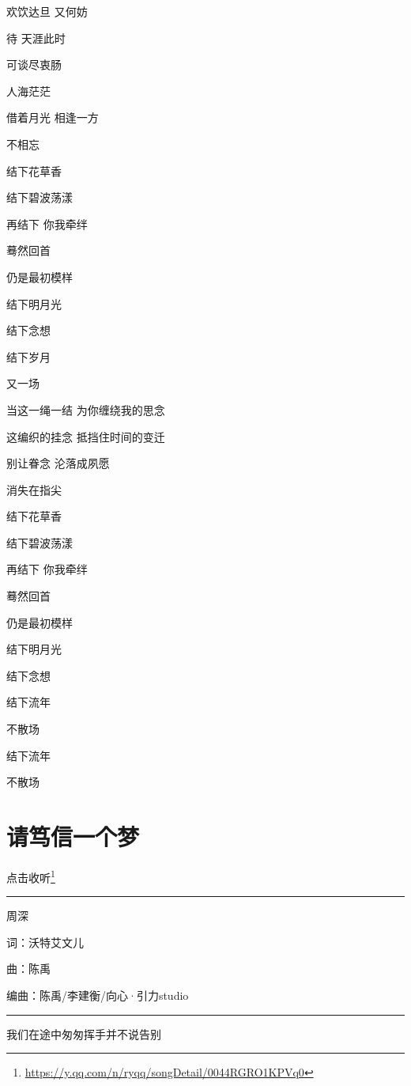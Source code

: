 \documentclass[]{ctexbook}
\renewcommand{\href}[2]{#2\footnote{\url{#1}}}
\begin{document}
欢饮达旦 又何妨

待 天涯此时

可谈尽衷肠

人海茫茫

借着月光 相逢一方

不相忘

结下花草香

结下碧波荡漾

再结下 你我牵绊

蓦然回首

仍是最初模样

结下明月光

结下念想

结下岁月

又一场

当这一绳一结 为你缠绕我的思念

这编织的挂念 抵挡住时间的变迁

别让眷念 沦落成夙愿

消失在指尖

结下花草香

结下碧波荡漾

再结下 你我牵绊

蓦然回首

仍是最初模样

结下明月光

结下念想

结下流年

不散场

结下流年

不散场

\section*{请笃信一个梦}\label{believe-your-dream}


\href{https://y.qq.com/n/ryqq/songDetail/0044RGRO1KPVq0}{点击收听}

\begin{center}\rule{0.5\linewidth}{0.5pt}\end{center}

周深

词：沃特艾文儿

曲：陈禹

编曲：陈禹/李建衡/向心·引力studio

\begin{center}\rule{0.5\linewidth}{0.5pt}\end{center}

我们在途中匆匆挥手并不说告别
\end{document}
